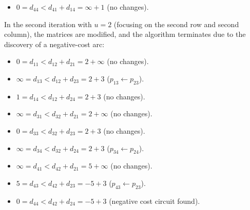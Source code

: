 \begin{example}
\begin{itemize}
        \item $0=d_{44} < d_{41} + d_{14} = \infty + 1$ (no changes). 
    \end{itemize}
    In the second iteration with $u=2$ (focusing on the second row and second column), the matrices are modified, and the algorithm terminates due to the discovery of a negative-cost arc:
    \begin{itemize}
        \item $0=d_{11} < d_{12} + d_{21} = 2 +\infty $ (no changes). 
        \item $\infty=d_{13} < d_{12} + d_{23} = 2+3$ ($p_{13} \leftarrow p_{23}$). 
        \item $1=d_{14} < d_{12} + d_{24} = 2+3$ (no changes). 
        \item $\infty=d_{31} < d_{32} + d_{21} = 2 + \infty$ (no changes). 
        \item $0=d_{33} < d_{32} + d_{23} = 2+3$ (no changes). 
        \item $\infty=d_{34} < d_{32} + d_{24} = 2+3$ ($p_{34} \leftarrow p_{24}$). 
        \item $\infty=d_{41} < d_{42} + d_{21} = 5 + \infty$ (no changes). 
        \item $5=d_{43} < d_{42} + d_{23} = -5+3$ ($p_{43} \leftarrow p_{23}$). 
        \item $0=d_{44} < d_{42} + d_{24} = -5+3$ (negative cost circuit found). 
    \end{itemize}
\end{example}


